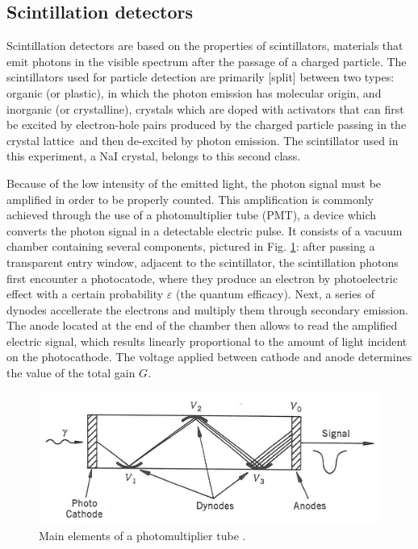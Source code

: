 \subsection{Scintillation detectors}
\label{sec:scinitillators}

Scintillation detectors are based on the properties of scintillators, materials that emit photons in the visible spectrum after the passage of a charged particle.
The scintillators used for particle detection are primarily [split] between two types: organic (or plastic), in which the photon emission has molecular origin, 
and inorganic (or crystalline), crystals which are doped with activators that can first be excited by electron-hole pairs 
produced by the charged particle passing in the crystal lattice\footnotemark\ and then de-excited by photon emission\cite{intro_nuclear_particle_physics}.
The scintillator used in this experiment, a NaI crystal, belongs to this second class.

Because of the low intensity of the emitted light, the photon signal must be amplified in order to be properly counted.
This amplification is commonly achieved through the use of a photomultiplier tube (PMT), a device which converts the photon signal in a detectable electric pulse.
It consists of a vacuum chamber containing several components, pictured in Fig. \ref{fig:photomultiplier}: 
after passing a transparent entry window, adjacent to the scintillator, the scintillation photons first encounter a photocatode, 
where they produce an electron by photoelectric effect with a certain probability $\varepsilon$ (the quantum efficacy).
Next, a series of dynodes accellerate the electrons and multiply them through secondary emission.
The anode located at the end of the chamber then allows to read the amplified electric signal, 
which results linearly proportional to the amount of light incident on the photocathode.
The voltage applied between cathode and anode determines the value of the total gain $G$.
%
\begin{figure}[htbp]
    \centering
    \includegraphics[scale=1.2]{figures/photomultiplier.jpg}
    \caption{Main elements of a photomultiplier tube \cite{intro_nuclear_particle_physics}.}
    \label{fig:photomultiplier}
\end{figure}

